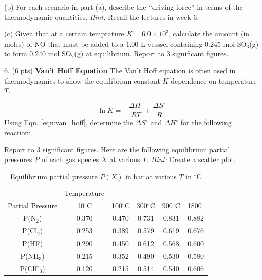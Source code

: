 \documentclass[11pt]{article}
\begin{document}
(b) For each scenario in part (a), describe the ``driving force'' in terms of the thermodynamic
quantities. \textit{Hint:} Recall the lectures in week 6.

(c) Given that at a certain temprature $K = 6.0\times 10^3$, calculate the amount (in moles)
of NO that must be added to a $1.00$ L vesssel containing 0.245 mol SO$_3$(g) to form
0.240 mol SO$_2$(g) at equilibrium. Report to 3 significant figures.

\pagebreak

6. (6 pts) \textbf{Van't Hoff Equation} The Van't Hoff equation is often used in thermodynamics
to show the equilibrium constant $K$ dependence on temperature $T$. 

\begin{equation}
  \ln K = -\frac{\Delta H^\circ}{RT} + \frac{\Delta S^\circ}{R}
  \label{eqn:van_hoff}
\end{equation}
Using Eqn. \ref{eqn:van_hoff}, determine the $\Delta S^\circ$ and $\Delta H^\circ$ for the following
reaction:
\begin{center}
\end{center}
Report to 3 significant figures. Here are the following equilibrium partial pressures $P$ of each
gas species $X$ at various $T$. \textit{Hint:} Create a scatter plot.

\begin{table}[hbpt]
  \caption{Equilibrium partial pressure $P(X)$ in bar at various $T$ in $^\circ$C}
  \center
  \begin{tabular}{c|ccccc}
    & Temperature \\
    Partial Pressure & 10$^\circ$C & 100$^\circ$C & 300$^\circ$C & 900$^\circ$C & 1800$^\circ$\\
    \hline
    P(N$_2$)    & 0.370 & 0.470 & 0.731 & 0.831 & 0.882 \\
    P(Cl$_2$)   & 0.253 & 0.389 & 0.579 & 0.619 & 0.676 \\
    P(HF)       & 0.290 & 0.450 & 0.612 & 0.568 & 0.600 \\
    P(NH$_3$)   & 0.215 & 0.352 & 0.490 & 0.530 & 0.580 \\
    P(ClF$_3$)  & 0.120 & 0.215 & 0.514 & 0.540 & 0.606 
  \end{tabular}
\end{table}

%
\end{document}
